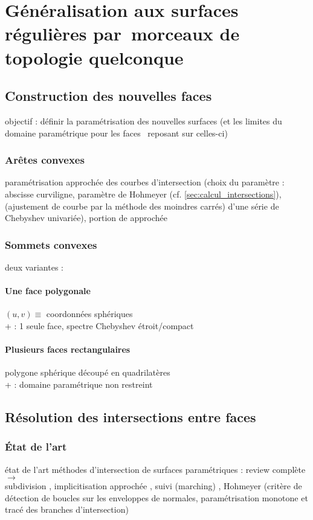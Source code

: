 \chapter[Généralisation aux surfaces de topologie quelconque]{Généralisation aux surfaces régulières par~morceaux de topologie quelconque}
\label{chap:multi_patch}

\section{Construction des nouvelles faces}

objectif : définir la paramétrisation des nouvelles surfaces (et les limites du domaine paramétrique pour les faces \brep\ reposant sur celles-ci)

\subsection{Arêtes convexes}
paramétrisation approchée des courbes d'intersection (choix du paramètre : abscisse curviligne, paramètre de Hohmeyer (cf. \autoref{sec:calcul_intersections}),  (ajustement de courbe par la méthode des moindres carrés) d'une série de Chebyshev univariée), portion de  approchée 

\subsection{Sommets convexes}
deux variantes :

\subsubsection{Une face polygonale}
$(u,v) \equiv$ coordonnées sphériques\\
+ : 1 seule face, spectre Chebyshev étroit/compact


\subsubsection{Plusieurs faces rectangulaires}
polygone sphérique découpé en quadrilatères \cite{hahn1989}\\
+ : domaine paramétrique non restreint


\section{Résolution des intersections entre faces}
\subsection{État de l'art}
état de l'art méthodes d'intersection de surfaces paramétriques :
review complète $\to$ \cite{patrikalakis2009}\\
subdivision \cite{houghton1985}, implicitisation approchée \cite{dokken2001}, suivi (marching) \cite{barnhill1990}, Hohmeyer \cite{hohmeyer1992} (critère de détection de boucles sur les enveloppes de normales, paramétrisation monotone et tracé des branches d'intersection)


